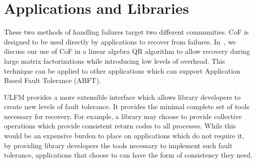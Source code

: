 \section{Applications and Libraries} \label{sect:applications}

These two methods of handling failures target two different communities. CoF is designed to be used directly by applications to recover from failures. In~\cite{Bland:EuroPar12}, we discuss our use of CoF in a linear algebra QR algorithm to allow recovery during large matrix factorizations while introducing low levels of overhead. This technique can be applied to other applications which can support Application Based Fault Tolerance (ABFT).

ULFM provides a more extensible interface which allows library developers to create new levels of fault tolerance. It provides the minimal complete set of tools necessary for recovery. For example, a library may choose to provide collective operations which provide consistent return codes to all processes. While this would be an expensive burden to place on applications which do not require it, by providing library developers the tools necessary to implement such fault tolerance, applications that choose to can have the form of consistency they need.